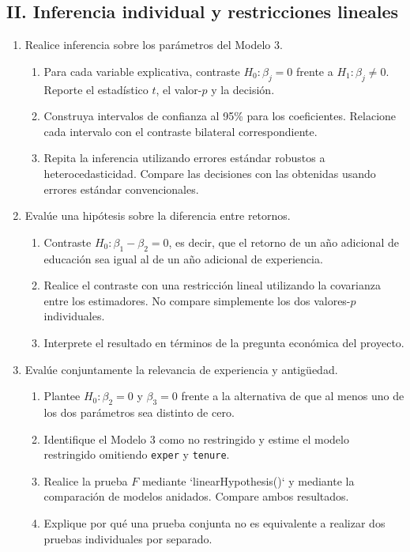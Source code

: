 \documentclass[letterpaper,11pt]{article}
\begin{document}
\subsection*{II. Inferencia individual y restricciones lineales}

\begin{enumerate}[resume]

\item Realice inferencia sobre los parámetros del Modelo 3.
    \begin{enumerate}[label=(\alph*)]
        \item Para cada variable explicativa, contraste
              $H_0:\beta_j=0$ frente a $H_1:\beta_j\neq0$. Reporte el
              estadístico $t$, el valor-$p$ y la decisión.
        \item Construya intervalos de confianza al 95\% para los coeficientes.
              Relacione cada intervalo con el contraste bilateral
              correspondiente.
        \item Repita la inferencia utilizando errores estándar robustos a
              heterocedasticidad. Compare las decisiones con las obtenidas
              usando errores estándar convencionales.
    \end{enumerate}

\item Evalúe una hipótesis sobre la diferencia entre retornos.
    \begin{enumerate}[label=(\alph*)]
        \item Contraste $H_0:\beta_1-\beta_2=0$, es decir, que el retorno de
              un año adicional de educación sea igual al de un año adicional
              de experiencia.
        \item Realice el contraste con una restricción lineal utilizando la
              covarianza entre los estimadores. No compare simplemente los
              dos valores-$p$ individuales.
        \item Interprete el resultado en términos de la pregunta económica del
              proyecto.
    \end{enumerate}

\item Evalúe conjuntamente la relevancia de experiencia y antigüedad.
    \begin{enumerate}[label=(\alph*)]
        \item Plantee $H_0:\beta_2=0$ y $\beta_3=0$ frente a la alternativa de
              que al menos uno de los dos parámetros sea distinto de cero.
        \item Identifique el Modelo 3 como no restringido y estime el modelo
              restringido omitiendo \texttt{exper} y \texttt{tenure}.
        \item Realice la prueba $F$ mediante `linearHypothesis()` y mediante
              la comparación de modelos anidados. Compare ambos resultados.
        \item Explique por qué una prueba conjunta no es equivalente a realizar
              dos pruebas individuales por separado.
    \end{enumerate}

\end{enumerate}
\end{document}
